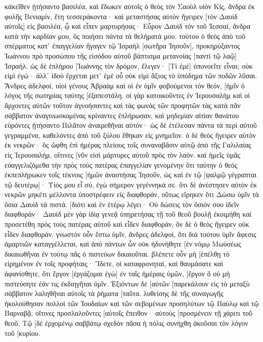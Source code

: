 κἀκεῖθεν ᾐτήσαντο βασιλέα, καὶ ἔδωκεν αὐτοῖς ὁ θεὸς τὸν Σαοὺλ υἱὸν Κίς, ἄνδρα ἐκ φυλῆς Βενιαμίν, ἔτη τεσσεράκοντα· 
καὶ μεταστήσας αὐτὸν ἤγειρεν [τὸν Δαυὶδ αὐτοῖς] εἰς βασιλέα, ᾧ καὶ εἶπεν μαρτυρήσας· Εὗρον Δαυὶδ τὸν τοῦ Ἰεσσαί, ἄνδρα κατὰ τὴν καρδίαν μου, ὃς ποιήσει πάντα τὰ θελήματά μου. 
τούτου ὁ θεὸς ἀπὸ τοῦ σπέρματος κατ᾽ ἐπαγγελίαν ἤγαγεν τῷ Ἰσραὴλ [σωτῆρα Ἰησοῦν], 
προκηρύξαντος Ἰωάννου πρὸ προσώπου τῆς εἰσόδου αὐτοῦ βάπτισμα μετανοίας [παντὶ τῷ λαῷ] Ἰσραήλ. 
ὡς δὲ ἐπλήρου [Ἰωάννης τὸν δρόμον, ἔλεγεν· [Τί ἐμὲ] ὑπονοεῖτε εἶναι; οὐκ εἰμὶ ἐγώ· ἀλλ᾽ ἰδοὺ ἔρχεται μετ᾽ ἐμὲ οὗ οὐκ εἰμὶ ἄξιος τὸ ὑπόδημα τῶν ποδῶν λῦσαι. 
Ἄνδρες ἀδελφοί, υἱοὶ γένους Ἀβραὰμ καὶ οἱ ἐν ὑμῖν φοβούμενοι τὸν θεόν, [ἡμῖν ὁ λόγος τῆς σωτηρίας ταύτης [ἐξαπεστάλη. 
οἱ γὰρ κατοικοῦντες ἐν Ἰερουσαλὴμ καὶ οἱ ἄρχοντες αὐτῶν τοῦτον ἀγνοήσαντες καὶ τὰς φωνὰς τῶν προφητῶν τὰς κατὰ πᾶν σάββατον ἀναγινωσκομένας κρίναντες ἐπλήρωσαν, 
καὶ μηδεμίαν αἰτίαν θανάτου εὑρόντες ᾐτήσαντο Πιλᾶτον ἀναιρεθῆναι αὐτόν· 
ὡς δὲ ἐτέλεσαν πάντα τὰ περὶ αὐτοῦ γεγραμμένα, καθελόντες ἀπὸ τοῦ ξύλου ἔθηκαν εἰς μνημεῖον. 
ὁ δὲ θεὸς ἤγειρεν αὐτὸν ἐκ νεκρῶν· 
ὃς ὤφθη ἐπὶ ἡμέρας πλείους τοῖς συναναβᾶσιν αὐτῷ ἀπὸ τῆς Γαλιλαίας εἰς Ἰερουσαλήμ, οἵτινες [νῦν εἰσὶ μάρτυρες αὐτοῦ πρὸς τὸν λαόν. 
καὶ ἡμεῖς ὑμᾶς εὐαγγελιζόμεθα τὴν πρὸς τοὺς πατέρας ἐπαγγελίαν γενομένην 
ὅτι ταύτην ὁ θεὸς ἐκπεπλήρωκεν τοῖς τέκνοις [ἡμῶν ἀναστήσας Ἰησοῦν, ὡς καὶ ἐν τῷ [ψαλμῷ γέγραπται τῷ δευτέρῳ]· Υἱός μου εἶ σύ, ἐγὼ σήμερον γεγέννηκά σε. 
ὅτι δὲ ἀνέστησεν αὐτὸν ἐκ νεκρῶν μηκέτι μέλλοντα ὑποστρέφειν εἰς διαφθοράν, οὕτως εἴρηκεν ὅτι Δώσω ὑμῖν τὰ ὅσια Δαυὶδ τὰ πιστά. 
[διότι καὶ ἐν ἑτέρῳ λέγει· Οὐ δώσεις τὸν ὅσιόν σου ἰδεῖν διαφθοράν· 
Δαυὶδ μὲν γὰρ ἰδίᾳ γενεᾷ ὑπηρετήσας τῇ τοῦ θεοῦ βουλῇ ἐκοιμήθη καὶ προσετέθη πρὸς τοὺς πατέρας αὐτοῦ καὶ εἶδεν διαφθοράν, 
ὃν δὲ ὁ θεὸς ἤγειρεν οὐκ εἶδεν διαφθοράν. 
γνωστὸν οὖν ἔστω ὑμῖν, ἄνδρες ἀδελφοί, ὅτι διὰ τούτου ὑμῖν ἄφεσις ἁμαρτιῶν καταγγέλλεται, καὶ ἀπὸ πάντων ὧν οὐκ ἠδυνήθητε [ἐν νόμῳ Μωϋσέως δικαιωθῆναι 
ἐν τούτῳ πᾶς ὁ πιστεύων δικαιοῦται. 
βλέπετε οὖν μὴ [ἐπέλθῃ τὸ εἰρημένον ἐν τοῖς προφήταις· 
Ἴδετε, οἱ καταφρονηταί, καὶ θαυμάσατε καὶ ἀφανίσθητε, ὅτι ἔργον [ἐργάζομαι ἐγὼ] ἐν ταῖς ἡμέραις ὑμῶν, [ἔργον ὃ οὐ μὴ πιστεύσητε ἐάν τις ἐκδιηγῆται ὑμῖν. 
Ἐξιόντων δὲ [αὐτῶν [παρεκάλουν εἰς τὸ μεταξὺ σάββατον λαληθῆναι αὐτοῖς τὰ ῥήματα [ταῦτα. 
λυθείσης δὲ τῆς συναγωγῆς ἠκολούθησαν πολλοὶ τῶν Ἰουδαίων καὶ τῶν σεβομένων προσηλύτων τῷ Παύλῳ καὶ τῷ Βαρναβᾷ, οἵτινες προσλαλοῦντες [αὐτοῖς ἔπειθον· αὐτοὺς [προσμένειν τῇ χάριτι τοῦ θεοῦ. 
Τῷ [δὲ ἐρχομένῳ σαββάτῳ σχεδὸν πᾶσα ἡ πόλις συνήχθη ἀκοῦσαι τὸν λόγον τοῦ [κυρίου. 
